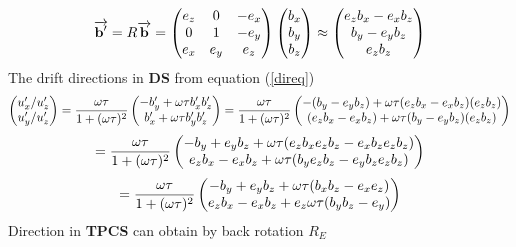 \documentclass[12pt]{article} %
\begin{document}
\begin{equation*} 
\overrightarrow{\mathbf{b'}} = R \overrightarrow{\mathbf{b}} =
\begin{pmatrix} 
    e_{z} & 0    & -e_{x} \cr
    0     &    1 & -e_{y} \cr
    e_{x} & e_{y}&  e_{z}
\end{pmatrix}
\begin{pmatrix} 
b_{x} \cr
b_{y} \cr
b_{z} 
\end{pmatrix}
\approx
\begin{pmatrix} 
e_{z} b_{x} - e_{x} b_{z}\cr
b_{y} -e_{y} b_{z} \cr
e_{z} b_{z} 
\end{pmatrix}
\end{equation*}
The drift directions in  {\bf DS} from equation (\ref{direq}) 
\begin{equation*}
\begin{pmatrix}
u'_{x}/u'_{z} \cr
u'_{y}/u'_{z}
\end{pmatrix}
=
\frac{\omega \tau}{1 + (\omega \tau )^2  }
\begin{pmatrix}
-  b'_{y} + \omega \tau  b'_{x} b'_{z} \cr
   b'_{x} + \omega \tau  b'_{y} b'_{z}    
\end{pmatrix}
=
\frac{\omega \tau}{1 + (\omega \tau )^2  }
\begin{pmatrix}
-  (b_{y} -e_{y} b_{z}) + \omega \tau  (e_{z} b_{x} - e_{x} b_{z}) (e_{z} b_{z} ) \cr
   (e_{z} b_{x} - e_{x} b_{z})  + \omega \tau  (b_{y} -e_{y} b_{z}) (e_{z} b_{z} ) \cr 
\end{pmatrix}
\end{equation*}
\begin{equation*}
=
\frac{\omega \tau}{1 + (\omega \tau )^2 }
\begin{pmatrix}
-  b_{y}       + e_{y} b_{z} + \omega \tau (e_{z} b_{x} e_{z} b_{z} - e_{x} b_{z} e_{z} b_{z})  \cr
   e_{z} b_{x} - e_{x} b_{z} + \omega \tau (b_{y} e_{z} b_{z}        -e_{y} b_{z} e_{z} b_{z})  \cr 
\end{pmatrix}
\end{equation*}
\begin{equation*}
=
\frac{\omega \tau }{1 + (\omega \tau )^2}
\begin{pmatrix}
-  b_{y}       + e_{y} b_{z} +       \omega \tau (b_{x} b_{z} - e_{x} e_{z} )  \cr
   e_{z} b_{x} - e_{x} b_{z} + e_{z} \omega \tau (b_{y} b_{z} - e_{y}       )  \cr 
\end{pmatrix}
\end{equation*}
Direction in {\bf TPCS} can obtain by back rotation $R_{E}$
\end{document}
